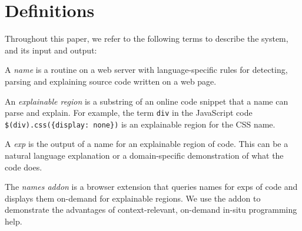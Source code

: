 \section{Definitions}

Throughout this paper,  we refer to the following terms to describe the system, and its input and output:

A \emph{\gls{name}} is a routine on a web server with language-specific rules for detecting, parsing and explaining source code written on a web page.

An \emph{explainable region} is a substring of an online code snippet that a \gls{name} can parse and explain.  For example, the term \texttt{div} in the JavaScript code \texttt{\$(\qs{}div\qs{}).css(\{\qs{}display\qs{}: \qs{}none\qs{}\})} is an explainable region for the CSS \gls{name}.

A \emph{\gls{exp}} is the output of a \gls{name} for an explainable region of code. This can be a natural language explanation or a domain-specific demonstration of what the code does.


The \emph{\Glspl{name} addon} is a browser extension that queries \glspl{name} for \glspl{exp} of code and displays them on-demand for explainable regions.  We use the addon to demonstrate the advantages of context-relevant, on-demand in-situ programming help.
